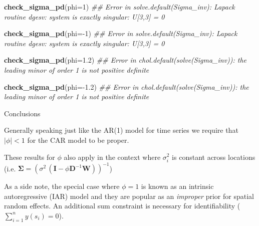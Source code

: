 \documentclass[11pt,ignorenonframetext,]{beamer}
\newenvironment{Shaded}{}{}
\newcommand{\CommentTok}[1]{\textcolor[rgb]{0.38,0.63,0.69}{\textit{#1}}}
\newcommand{\DataTypeTok}[1]{\textcolor[rgb]{0.56,0.13,0.00}{#1}}
\newcommand{\DecValTok}[1]{\textcolor[rgb]{0.25,0.63,0.44}{#1}}
\newcommand{\FloatTok}[1]{\textcolor[rgb]{0.25,0.63,0.44}{#1}}
\newcommand{\KeywordTok}[1]{\textcolor[rgb]{0.00,0.44,0.13}{\textbf{#1}}}
\newcommand{\NormalTok}[1]{#1}
\newcommand{\OperatorTok}[1]{\textcolor[rgb]{0.40,0.40,0.40}{#1}}
\let\oldShaded\Shaded
\let\endoldShaded\endShaded
\renewenvironment{Shaded}{\footnotesize\begin{spacing}{0.9}\oldShaded}{\endoldShaded\end{spacing}}
\begin{document}
\begin{frame}[fragile]{}
\protect\hypertarget{section-3}{}

\begin{Shaded}
\begin{Highlighting}[]
\KeywordTok{check_sigma_pd}\NormalTok{(}\DataTypeTok{phi=}\DecValTok{1}\NormalTok{)}
\CommentTok{## Error in solve.default(Sigma_inv): Lapack routine dgesv: system is exactly singular: U[3,3] = 0}

\KeywordTok{check_sigma_pd}\NormalTok{(}\DataTypeTok{phi=}\OperatorTok{-}\DecValTok{1}\NormalTok{)}
\CommentTok{## Error in solve.default(Sigma_inv): Lapack routine dgesv: system is exactly singular: U[3,3] = 0}

\KeywordTok{check_sigma_pd}\NormalTok{(}\DataTypeTok{phi=}\FloatTok{1.2}\NormalTok{)}
\CommentTok{## Error in chol.default(solve(Sigma_inv)): the leading minor of order 1 is not positive definite}

\KeywordTok{check_sigma_pd}\NormalTok{(}\DataTypeTok{phi=}\OperatorTok{-}\FloatTok{1.2}\NormalTok{)}
\CommentTok{## Error in chol.default(solve(Sigma_inv)): the leading minor of order 1 is not positive definite}
\end{Highlighting}
\end{Shaded}

\end{frame}

\begin{frame}[t]{Conclusions}
\protect\hypertarget{conclusions}{}

Generally speaking just like the AR(1) model for time series we require
that \(|\phi| < 1\) for the CAR model to be proper.

\vspace{4mm}

These results for \(\phi\) also apply in the context where
\(\sigma^2_i\) is constant across locations (i.e.
\(\symbf{\Sigma} = (\sigma^2 \, (\symbf{I}-\phi \symbf{D}^{-1}\symbf{W}))^{-1}\))

\vspace{8mm}

As a side note, the special case where \(\phi=1\) is known as an
intrinsic autoregressive (IAR) model and they are popular as an
\emph{improper} prior for spatial random effects. An additional sum
constraint is necessary for identifiability
(\(\sum_{i=1}^n y(s_i) = 0\)).

\end{frame}
\end{document}

